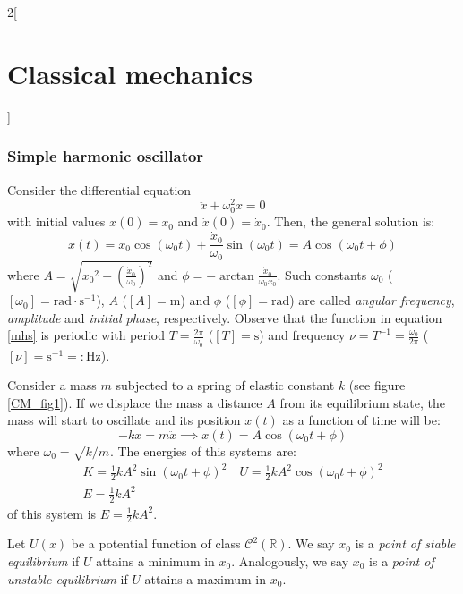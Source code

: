 \documentclass[../../../main.tex]{subfiles}
\begin{document}
\begin{multicols}{2}[\section{Classical mechanics}]
  \subsubsection{Simple harmonic oscillator}
  \begin{prop}
    Consider the differential equation $$\ddot{x}+\omega_0^2 x=0$$ with initial values $x(0)=x_0$ and $\dot{x}(0)=\dot{x}_0$. Then, the general solution is:
    \begin{equation}
      x(t)=x_0\cos(\omega_0t)+\frac{\dot{x}_0}{\omega_0}\sin(\omega_0t)=A\cos(\omega_0t+\phi)
      \label{mhs}
    \end{equation} where $\displaystyle A=\sqrt{{x_0}^2+{\left(\frac{\dot{x}_0}{\omega_0}\right)}^2}$ and $\displaystyle \phi=-\arctan\frac{\dot{x}_0}{\omega_0x_0}$. Such constants $\omega_0$ ($[\omega_0]=\text{rad}\cdot \text{s}^{-1}$), $A$ ($[A]=\text{m}$) and $\phi$ ($[\phi]=\text{rad}$) are called \textit{angular frequency}, \textit{amplitude} and \textit{initial phase}, respectively. Observe that the function in equation \eqref{mhs} is periodic with period $T=\frac{2\pi}{\omega_0}$ ($[T]=\text{s}$) and frequency $\nu=T^{-1}=\frac{\omega_0}{2\pi}$ ($[\nu]=\text{s}^{-1}=:\text{Hz}$).
  \end{prop}
  \begin{prop}
    Consider a mass $m$ subjected to a spring of elastic constant $k$ (see figure \ref{CM_fig1}). If we displace the mass a distance $A$ from its equilibrium state, the mass will start to oscillate and its position $x(t)$ as a function of time will be:
    $$-kx=m\ddot{x}\implies x(t)=A\cos(\omega_0t+\phi)$$ where $\omega_0=\sqrt{k/m}$. The energies of this systems are:
    \begin{gather*}
      K=\frac{1}{2}kA^2\sin(\omega_0 t+\phi)^2\quad U=\frac{1}{2}kA^2\cos(\omega_0 t+\phi)^2\\
      E=\frac{1}{2}kA^2
    \end{gather*}
    of this system is $E=\frac{1}{2}kA^2$.
    \begin{center}
      \begin{minipage}{\linewidth}
        \centering
        
        \label{CM_fig1}
      \end{minipage}
    \end{center}
  \end{prop}
  \begin{definition}
    Let $U(x)$ be a potential function of class $\mathcal{C}^2(\mathbb{R})$. We say $x_0$ is a \textit{point of stable equilibrium} if $U$ attains a minimum in $x_0$. Analogously, we say $x_0$ is a \textit{point of unstable equilibrium} if $U$ attains a maximum in $x_0$.

\end{definition}
\end{multicols}
\end{document}
